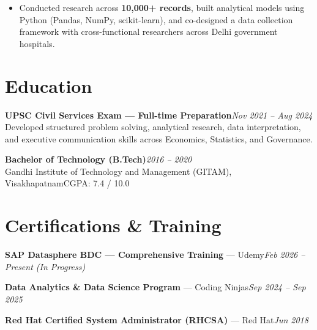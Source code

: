 \documentclass[10pt, letterpaper]{article}
\begin{document}
\begin{itemize}
  \item Conducted research across \textbf{10,000+ records}, built analytical models using Python (Pandas, NumPy, scikit-learn), and co-designed a data collection framework with cross-functional researchers across Delhi government hospitals.
\end{itemize}

\section{Education}

{\bfseries UPSC Civil Services Exam — Full-time Preparation}\hfill{\small\color{muted}\textit{Nov 2021 – Aug 2024}}\\
{\small\color{muted}Developed structured problem solving, analytical research, data interpretation, and executive communication skills across Economics, Statistics, and Governance.}

\vspace{2pt}
{\bfseries Bachelor of Technology (B.Tech)}\hfill{\small\color{muted}\textit{2016 – 2020}}\\
{\small\color{muted}Gandhi Institute of Technology and Management (GITAM), Visakhapatnam\hfill CGPA: 7.4 / 10.0}

\section{Certifications \& Training}

{\bfseries SAP Datasphere BDC — Comprehensive Training} — Udemy\hfill{\small\color{muted}\textit{Feb 2026 – Present \emph{(In Progress)}}}

\vspace{1pt}
{\bfseries Data Analytics \& Data Science Program} — Coding Ninjas\hfill{\small\color{muted}\textit{Sep 2024 – Sep 2025}}

\vspace{1pt}
{\bfseries Red Hat Certified System Administrator (RHCSA)} — Red Hat\hfill{\small\color{muted}\textit{Jun 2018}}

\end{document}
